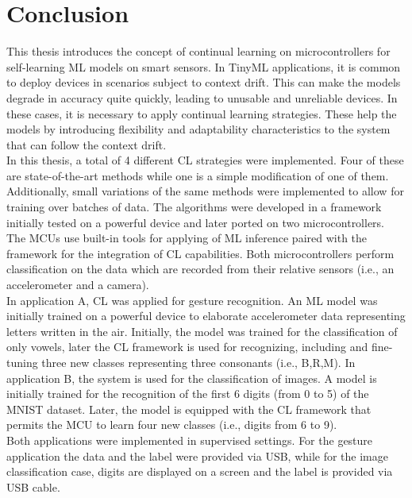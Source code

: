\documentclass[12pt]{report}
\begin{document}
\chapter{Conclusion}
This thesis introduces the concept of continual learning on microcontrollers for self-learning ML models on smart sensors. In TinyML applications, it is common to deploy devices in scenarios subject to context drift. This can make the models degrade in accuracy quite quickly, leading to unusable and unreliable devices. In these cases, it is necessary to apply continual learning strategies. These help the models by introducing flexibility and adaptability characteristics to the system that can follow the context drift.\\
In this thesis, a total of 4 different CL strategies were implemented. Four of these are state-of-the-art methods while one is a simple modification of one of them. Additionally, small variations of the same methods were implemented to allow for training over batches of data. The algorithms were developed in a framework initially tested on a powerful device and later ported on two microcontrollers. The MCUs use built-in tools for applying of ML inference paired with the framework for the integration of CL capabilities. Both microcontrollers perform classification on the data which are recorded from their relative sensors (i.e., an accelerometer and a camera).\\
In application A, CL was applied for gesture recognition. An ML model was initially trained on a powerful device to elaborate accelerometer data representing letters written in the air. Initially, the model was trained for the classification of only vowels, later the CL framework is used for recognizing, including and fine-tuning three new classes representing three consonants (i.e., B,R,M). 
In application B, the system is used for the classification of images. A model is initially trained for the recognition of the first 6 digits (from 0 to 5) of the MNIST dataset. Later, the model is equipped with the CL framework that permits the MCU to learn four new classes (i.e., digits from 6 to 9).\\
Both applications were implemented in supervised settings. For the gesture application the data and the label were provided via USB, while for the image classification case, digits are displayed on a screen and the label is provided via USB cable.
\end{document}
